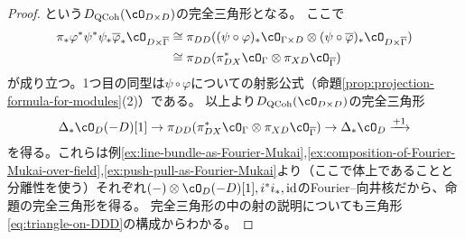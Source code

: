 \documentclass[uplatex, a4paper, dvipdfmx]{jsarticle}
\theoremstyle{definition}
\DeclareMathOperator{\id}{\mathrm{id}}
\DeclareMathOperator{\QCoh}{\mathrm{QCoh}}
\begin{document}
\begin{proof}
    という$D_{\QCoh}(\cO_{D \times D})$の完全三角形となる。
    ここで
    \begin{align}
        \pi_*\varphi^*\psi^*\psi_*\overline{\varphi}_*\cO_{D \times \overline{\Gamma}} & \cong \pi_{DD}((\psi \circ \varphi)_*\cO_{\Gamma \times D} \otimes (\psi \circ \overline{\varphi})_*\cO_{D \times \overline{\Gamma}}) \\
                                                                                       & \cong \pi_{DD}(\pi_{DX}^*\cO_{\Gamma} \otimes \pi_{XD}\cO_{\overline{\Gamma}})
    \end{align}
    が成り立つ。1つ目の同型は$\psi \circ \varphi$についての射影公式（命題\ref{prop:projection-formula-for-modules}(2)）である。
    以上より$D_{\QCoh}(\cO_{D \times D})$の完全三角形
    \begin{equation}\label{eq:triangle-on-DD}
        \Delta_*\cO_D(-D)[1] \to \pi_{DD}(\pi_{DX}^*\cO_{\Gamma} \otimes \pi_{XD}\cO_{\overline{\Gamma}}) \to \Delta_*\cO_D \xrightarrow{+1}
    \end{equation}
    を得る。これらは例\ref{ex:line-bundle-as-Fourier-Mukai},\ref{ex:composition-of-Fourier-Mukai-over-field},\ref{ex:push-pull-as-Fourier-Mukai}より（ここで体上であることと分離性を使う）それぞれ$(-)\otimes \cO_D(-D)[1], i^*i_*, \id$のFourier--向井核だから、命題の完全三角形を得る。
    完全三角形の中の射の説明についても三角形\eqref{eq:triangle-on-DDD}の構成からわかる。
\end{proof}
\end{document}
